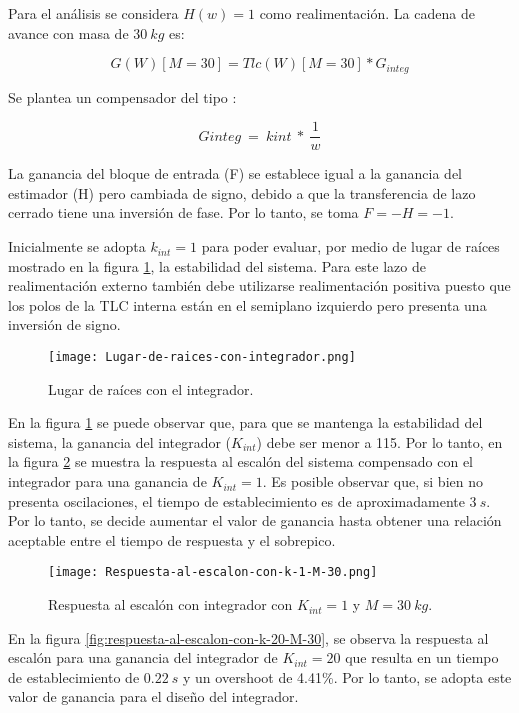 \noindent Para el an\'{a}lisis se considera $H(w)=1$ como realimentaci\'{o}n. La cadena de avance con masa de $30\:kg$ es:

\[G(W)[M=30]=Tlc(W)[M=30]*G_{integ}\] 

\noindent Se  plantea un compensador del tipo :

\[Ginteg\ =\ kint\ *\ \frac{1}{w}\] 

\noindent La ganancia del bloque de entrada (F) se establece igual a la ganancia del estimador (H) pero cambiada de signo, debido a que la transferencia de lazo cerrado tiene una inversi\'{o}n de fase. Por lo tanto, se toma $F=-H=-1$.

\noindent Inicialmente se adopta $k_{int} = 1$ para poder evaluar, por medio de lugar de ra\'{i}ces mostrado en la figura \ref{fig:lugar-de-raices-con-integrador}, la estabilidad del sistema. Para este lazo de realimentaci\'{o}n externo tambi\'{e}n debe utilizarse realimentaci\'{o}n positiva puesto que los polos de la TLC interna est\'{a}n en el semiplano izquierdo pero presenta una inversi\'{o}n de signo.


\begin{figure}[H]
	\centering
	\texttt{[image: Lugar-de-raices-con-integrador.png]}
	\caption{Lugar de raíces con el integrador.}
	\label{fig:lugar-de-raices-con-integrador}
\end{figure}


\noindent En la figura \ref{fig:lugar-de-raices-con-integrador} se puede observar que, para que se mantenga la estabilidad del sistema, la ganancia del integrador ($K_{int}$) debe ser menor a 115. Por lo tanto, en la figura \ref{fig:respuesta-al-escalon-con-k-1-M-30} se muestra la respuesta al escal\'{o}n del sistema compensado con el integrador para una ganancia de $K_{int}=1$.  Es posible observar que, si bien no presenta oscilaciones, el tiempo de establecimiento es de aproximadamente $3\:s$. Por lo tanto, se decide aumentar el valor de ganancia hasta obtener una relaci\'{o}n aceptable entre el tiempo de respuesta y el sobrepico.


\begin{figure}[H]
	\centering
	\texttt{[image: Respuesta-al-escalon-con-k-1-M-30.png]}
	\caption{Respuesta al escalón con integrador con $K_{int} =1$ y $M=30\:kg$.}
	\label{fig:respuesta-al-escalon-con-k-1-M-30}
\end{figure}


\noindent En la figura \ref{fig:respuesta-al-escalon-con-k-20-M-30}, se observa la respuesta al escal\'{o}n para una ganancia del integrador de $K_{int}=20$ que resulta en un tiempo de establecimiento de $0.22\:s$ y un overshoot de 4.41\%. Por lo tanto, se adopta este valor de ganancia para el dise\~{n}o del integrador.


